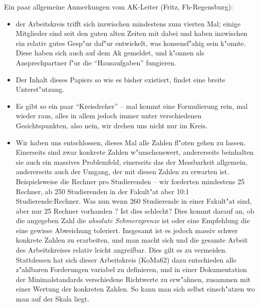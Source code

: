 \documentclass[10pt,twoside,a5paper,openright]{book}
\newenvironment{komacmt62}{%
\marginpar{\framebox{62}} %
\begin{center}\begin{minipage}{.8\textwidth}\normalfont \mdseries \sffamily \small \color{grau} }{\end{minipage}\end{center} %
}
\begin{document}
\begin{kcmt62}
\begin{komacmt62}
Ein paar allgemeine Anmerkungen vom AK-Leiter (Fritz, Fh-Regensburg):
\begin{itemize}
\item der Arbeitskreis trifft sich inzwischen mindestens zum vierten Mal; einige
 Mitglieder sind seit den guten alten Zeiten mit dabei und haben inzwischen ein
 relativ gutes Gesp"ur daf"ur entwickelt, was konsensf"ahig sein k"onnte. Diese
 haben sich auch auf dem Ak gemeldet, und k"onnen als Ansprechpartner f"ur die
 "`Hausaufgaben"' fungieren.
\item Der Inhalt dieses Papiers so wie es bisher existiert, findet eine breite
 Unterst"utzung.
\item Es gibt so ein paar "`Kreisdreher"' -- mal kommt eine Formulierung rein, mal
 wieder raus, alles in allem jedoch immer unter verschiedenen Gesichtspunkten,
 also nein, wir drehen uns nicht nur im Kreis.
\item Wir haben uns entschlossen, dieses Mal alle Zahlen fl"oten gehen zu lassen.
 Einerseits sind zwar konkrete Zahlen w"unschenswert, andererseits beinhalten sie
 auch ein massives Problemfeld, einerseits das der Messbarkeit allgemein, andererseits
 auch der Umgang, der mit diesen Zahlen zu erwarten ist. Beispielsweise die Rechner
 pro Studierenden -- wir forderten mindestens 25 Rechner, ab 250 Studierenden in
 der Fakult"at aber 10:1 Studierende:Rechner. Was nun wenn 260 Studierende in einer
 Fakult"at sind, aber nur 25 Rechner vorhanden ? Ist dies schlecht? Dies kommt darauf
 an, ob die angegeben Zahl die \emph{absolute Schmerzgrenze} ist oder eine Empfehlung
 die eine gewisse Abweichung toleriert. Insgesamt ist es jedoch massiv schwer konkrete
 Zahlen zu erarbeiten, und man macht sich und die gesamte Arbeit des Arbeitskreises
 relativ leicht angreifbar. Dies gilt es zu vermeiden. Stattdessen hat sich dieser
 Arbeitskreis (KoMa62) dazu entschieden alle z"ahlbaren Forderungen variabel zu
 definieren, und in einer Dokumentation der Minimalstandards verschiedene Richtwerte
 zu erw"ahnen, zusammen mit einer Wertung der konkreten Zahlen. So kann man sich
 selbst einsch"atzen wo man auf der Skala liegt.
\end{itemize}
\end{komacmt62}
\end{kcmt62}

\mainmatter

\newpage


\newpage




\newpage


\newpage


\newpage

\end{document}
